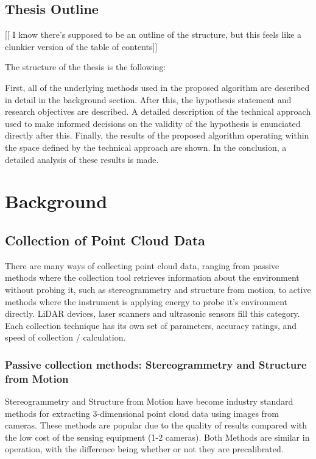 \documentclass[12pt]{drexelthesis}
\let\Oldsection\section
\renewcommand{\section}{\FloatBarrier\Oldsection}
\let\Oldsubsection\subsection
\renewcommand{\subsection}{\FloatBarrier\Oldsubsection}
\begin{document}
\section{Thesis Outline}

[[ I know there's supposed to be an outline of the structure, but this feels like a clunkier version of the table of contents]]

The structure of the thesis is the following:

First, all of the underlying methods used in the proposed algorithm are described in detail in the background section. After this, the hypothesis statement and research objectives are described. A detailed description of the technical approach used to make informed decisions on the validity of the hypothesis is enunciated directly after this. Finally, the results of the proposed algorithm operating within the space defined by the technical approach are shown. In the conclusion, a detailed analysis of these results is made.
















\chapter{Background}
\label{chap:background}
\section{Collection of Point Cloud Data}
\label{sec:PCcollection}
There are many ways of collecting point cloud data, ranging from passive methods where the collection tool retrieves information about the environment without probing it, such as stereogrammetry and structure from motion, to active methods where the instrument is applying energy to probe it's environment directly. LiDAR devices, laser scanners and ultrasonic sensors fill this category. Each collection technique has its own set of parameters, accuracy ratings, and speed of collection / calculation.

\subsection{Passive collection methods: Stereogrammetry and Structure from Motion}
\label{subsec:passive}
Stereogrammetry and Structure from Motion have become industry standard methods for extracting 3-dimensional point cloud data using images from cameras. These methods are popular due to the quality of results compared with the low cost of the sensing equipment (1-2 cameras). Both Methods are similar in operation, with the difference being whether or not they are precalibrated.
\end{document}
